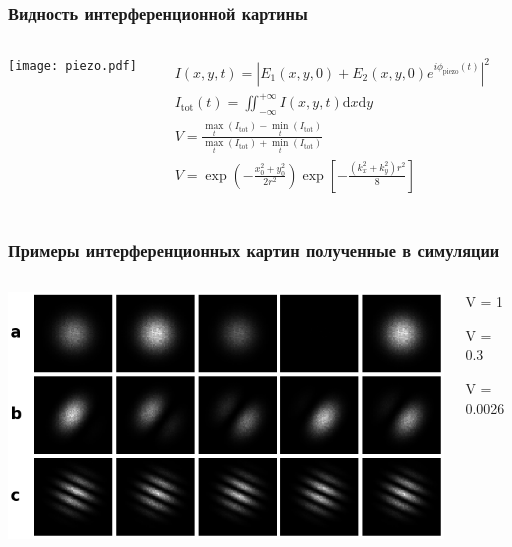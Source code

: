 \begin{frame}
\frametitle{Видность интерференционной картины}

\begin{columns}
\centering
\texttt{[image: piezo.pdf]}

\begin{align*}
& I(x,y,t)=|E_1(x,y,0)+E_2(x,y,0)e^{i\phi_{\mathrm{piezo}}(t)}|^2 \\
& I_{\mathrm{tot}}(t) = \iint_{-\infty}^{+\infty} I(x, y, t) {\mathrm{d}}x{\mathrm{d}}y \\
& V = \frac{            
        \max_{t}(I_{\mathrm{tot}}) - \min_t(I_{\mathrm{tot}})}
        {\max_{t}(I_{\mathrm{tot}}) + \min_t(I_{\mathrm{tot}})} \\
& V = \exp\left(- \frac{x_0^2 + y_0^2}{2 r^2}\right)  \exp\left[- \frac{(k_x^2 + k_y^2) r^2}{8}\right] \\
\end{align*}

\end{columns}
\end{frame}

\begin{frame}
\frametitle{Примеры интерференционных картин полученные в симуляции}
\begin{columns}
  \centering
   \includegraphics[scale=0.4]{images/visib_expl.png}

\begin{description}
    \item V = 1
    \vspace{30pt}
    \item V = 0.3
    \vspace{30pt}
    \item V = 0.0026
\end{description}

\end{columns} 
\end{frame}


